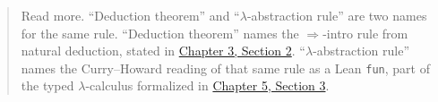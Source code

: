 \begin{quote}
Read more. ``Deduction theorem'' and ``\(\lambda\)-abstraction rule'' are two names for the same rule. ``Deduction theorem'' names the \(\Rightarrow\)-intro rule from natural deduction, stated in \hyperref[sec:03-propositions-and-proofs:02-logic-recap:1]{Chapter 3, Section 2}. ``\(\lambda\)-abstraction rule'' names the Curry--Howard reading of that same rule as a Lean \texttt{fun}, part of the typed \(\lambda\)-calculus formalized in \hyperref[sec:05-rigor-check:03-typing-rules-and-safety:1]{Chapter 5, Section 3}.
\end{quote}
